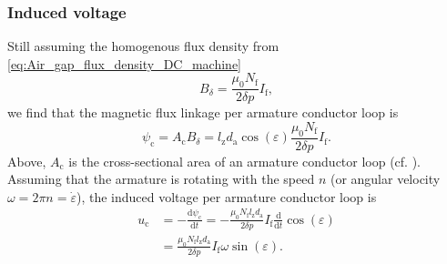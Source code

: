 \begin{frame}
	\frametitle{Induced voltage}
	 Still assuming the homogenous flux density from \eqref{eq:Air_gap_flux_density_DC_machine} $$B_\delta = \frac{\mu_0 N_\mathrm{f}}{2 \delta p} I_\mathrm{f},$$ \pause we find that the magnetic flux linkage per armature conductor loop is
	\begin{equation}
		\psi_\mathrm{c} = A_\mathrm{c}B_\delta= l_\mathrm{z} d_\mathrm{a}\cos(\varepsilon) \frac{\mu_0 N_\mathrm{f}}{2 \delta p} I_\mathrm{f}.
		\label{eq:Magnetic_flux_linkage_per_conductor}
	\end{equation} 
	Above, $A_\mathrm{c}$ is the cross-sectional area of an armature conductor loop (cf. ). \pause Assuming that the armature is rotating with the speed $n$ (or angular velocity $\omega = 2 \pi n=\dot{\varepsilon}$), the induced voltage per armature conductor loop is
	\begin{equation}
		\begin{split}
			u_\mathrm{c} &= -\frac{\mathrm{d}\psi_\mathrm{c}}{\mathrm{d}t} = -\frac{\mu_0 N_\mathrm{f} l_\mathrm{z} d_\mathrm{a}}{2 \delta p} I_\mathrm{f} \frac{\mathrm{d}}{\mathrm{d}t} \cos(\varepsilon)\\
			&= \frac{\mu_0 N_\mathrm{f} l_\mathrm{z} d_\mathrm{a}}{2 \delta p} I_\mathrm{f} \omega \sin(\varepsilon).
		\end{split}
		\label{eq:Induced_voltage_per_conductor}
	\end{equation}
\end{frame}

